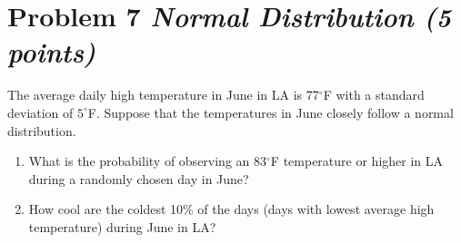 \documentclass[11pt,twoside]{article}
\newcommand{\pts}[1]{\marginpar{ \small\hspace{0pt} \textit{[#1]} } }
\numberwithin{equation}{section}
\newcommand{\lt}{\left}
\newcommand{\rt}{\right}
\newcommand{\?}{\stackrel{?}{=}}
\newcommand{\fr}{\frac}
\begin{document}
\eject

\section*{Problem 7  \textit{Normal Distribution (5 points)}}
The average daily high temperature in June in LA is 77$^{\circ}$F with a standard deviation of $5^{\circ}$F.
Suppose that the temperatures in June closely follow a normal distribution.

\begin{enumerate}[\bf (a)]
\item What is the probability of observing an 83$^{\circ}$F temperature \pts{2} or higher in LA during a randomly chosen day in
  June?
 \vspace{40ex}

\item How cool are the coldest 10\% of the days \pts{3} (days with lowest average high temperature) during June in LA?
 
\end{enumerate}



 
  
  
\end{document}
